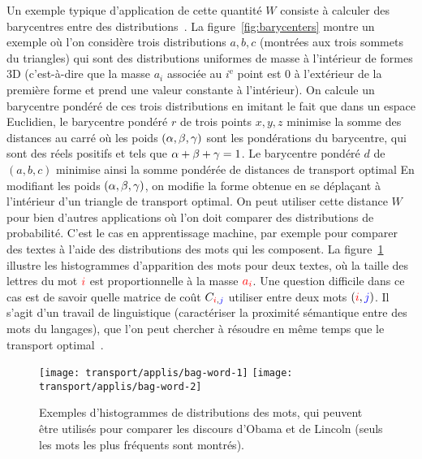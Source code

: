 Un exemple typique d'application de cette quantité $W$ consiste à calculer des barycentres entre des distributions~\cite{agueh2011barycenters}. La figure~\ref{fig:barycenters} montre un exemple où l'on considère trois distributions $a,b,c$ (montrées aux trois sommets du triangles) qui sont des distributions uniformes de masse à l'intérieur de formes 3D (c'est-à-dire que la masse $a_i$ associée au $i^{\text{e}}$ point est 0 à l'extérieur de la première forme et prend une valeur constante à l'intérieur). 
%
On calcule un barycentre pondéré de ces trois distributions en imitant le fait que dans un espace Euclidien, le barycentre pondéré $r$ de trois points $x,y,z$ minimise la somme des distances au carré
où les poids $(\alpha,\beta,\gamma)$ sont les pondérations du barycentre, qui sont des réels positifs et tels que $\alpha+\beta+\gamma=1$.
%
Le barycentre pondéré $d$  de $(a,b,c)$ minimise ainsi la somme pondérée de distances de transport optimal
En modifiant les poids $(\alpha,\beta,\gamma)$, on modifie la forme obtenue en se déplaçant à l'intérieur d'un triangle de transport optimal. 
%
On peut utiliser cette distance $W$ pour bien d'autres applications où l'on doit comparer des distributions de probabilité. C'est le cas en apprentissage machine, par exemple pour comparer des textes à l'aide des distributions des mots qui les composent. La figure~\ref{fig:bagwords} illustre les histogrammes d'apparition des mots pour deux textes, où la taille des lettres du mot ${\color{red}i}$ est proportionnelle à la masse ${\color{red}a}_{\color{red}i}$. Une question difficile dans ce cas est de savoir quelle matrice de coût $C_{{\color{red}i},{\color{blue}j}}$ utiliser entre deux mots $({\color{red}i},{\color{blue}j})$. Il s'agit d'un travail de linguistique (caractériser la proximité sémantique entre des mots du langages), que l'on peut chercher à résoudre en même temps que le transport optimal~\cite{huang2016supervised}. 

\begin{figure}\centering
    \texttt{[image: transport/applis/bag-word-1]}
    \qquad
    \texttt{[image: transport/applis/bag-word-2]}
\caption{\label{fig:bagwords} Exemples d'histogrammes de distributions des mots, qui peuvent être utilisés pour comparer les discours d'Obama et de Lincoln (seuls les mots les plus fréquents sont montrés).  }
\end{figure}


